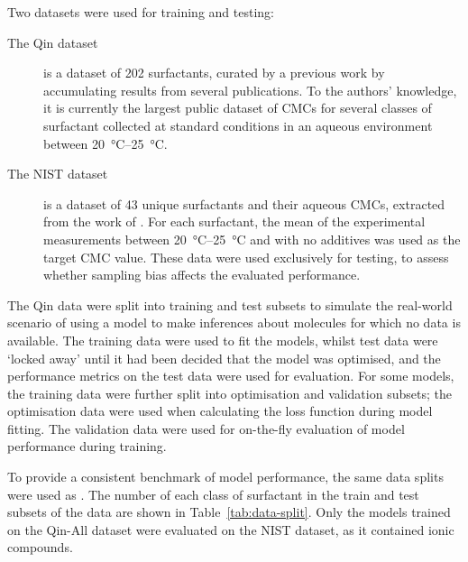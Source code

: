 \newcommand{\lrv}{\vec{v}^{\,(p)}}

Two datasets were used for training and testing:

\begin{description}
    \item[The Qin dataset] is a dataset of 202 surfactants, curated by a
          previous work \cite{qinPredictingCriticalMicelle2021} by accumulating
          results from several publications. To the authors' knowledge, it is
          currently the largest public dataset of CMCs for several classes of
          surfactant collected at standard conditions in an aqueous environment
          between \SIrange{20}{25}{\celsius}.
    \item[The NIST dataset] is a dataset of 43 unique surfactants and their
          aqueous CMCs, extracted from the work of
          \citet{mukerjeeCriticalMicelleConcentrations1971}. For each
          surfactant, the mean of the experimental measurements between
          \SIrange{20}{25}{\degreeCelsius} and with no additives was used as the
          target CMC value. These data were used exclusively for testing, to
          assess whether sampling bias affects the evaluated performance.
\end{description}

The Qin data were split into training and test subsets to simulate the real-world scenario of using a model to make inferences about molecules for which no data is available. The training data were used to fit the models,
whilst test data were `locked away' until it had been decided that the model was optimised, and the performance metrics on the test data were used for evaluation. For some models, the training data were further split into optimisation and validation subsets; the optimisation data were used when calculating the loss function during model fitting. The validation data were used for on-the-fly evaluation of model performance during training.

To provide a consistent benchmark of model performance, the same data splits were used as \citet{qinPredictingCriticalMicelle2021}. The number of each class of surfactant in the train and test subsets of the data are shown in Table~\ref{tab:data-split}. Only the models trained on the Qin-All dataset were evaluated on the NIST dataset, as it contained ionic compounds.

